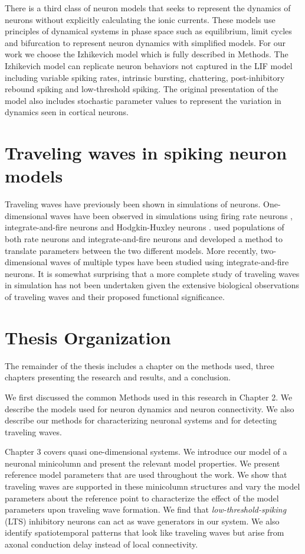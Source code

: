 There is a third class of neuron models that seeks to represent the dynamics of neurons without explicitly calculating the ionic currents.
These models use principles of dynamical systems in phase space such as equilibrium, limit cycles and bifurcation to represent neuron dynamics with simplified models.
For our work we choose the Izhikevich model\citep{izhikevich2003} which is fully described in Methods.
The Izhikevich model can replicate neuron behaviors not captured in the LIF model including variable spiking rates, intrinsic bursting, chattering, post-inhibitory rebound spiking and low-threshold spiking.
The original presentation of the model also includes stochastic parameter values to represent the variation in dynamics seen in cortical neurons.

\section{Traveling waves in spiking neuron models}
Traveling waves have previously been shown in simulations of neurons.
One-dimensional waves have been observed in simulations using firing rate neurons \citep{Roxin2005}, integrate-and-fire neurons \citep{Bressloff1997}\citep{Golomb1999} and Hodgkin-Huxley neurons \citep{Golomb1997}.
\citet{Senk2020} used populations of both rate neurons and integrate-and-fire neurons and developed a method to translate parameters between the two different models.
More recently, two-dimensional waves of multiple types have been studied using integrate-and-fire neurons\citep{keane2015}\citep{Keane2018}\citep{Spreizer2019}\citep{Chen2019}.
It is somewhat surprising that a  more complete study of traveling waves in simulation has not been undertaken given the extensive biological observations of traveling waves
and their proposed functional significance.

\section{Thesis Organization}
The remainder of the thesis includes a chapter on the methods used, three chapters presenting the research and results, and a conclusion.

We first discussed the common Methods used in this research in Chapter 2.
We describe the models used for neuron dynamics and neuron connectivity.
We also describe our methods for characterizing neuronal systems and for detecting traveling waves.

Chapter 3 covers quasi one-dimensional systems. 
We introduce our model of a neuronal minicolumn and present the relevant model properties.
We present reference model parameters  that are used throughout the work.
We show that traveling waves are supported in these minicolumn structures and vary the model parameters about the reference point 
to characterize the effect of the model parameters upon traveling wave formation.
We find that \textit{low-threshold-spiking} (LTS) inhibitory neurons can act as wave generators in our system.
We also identify spatiotemporal patterns that look like traveling waves but arise from axonal conduction delay instead of local connectivity.

